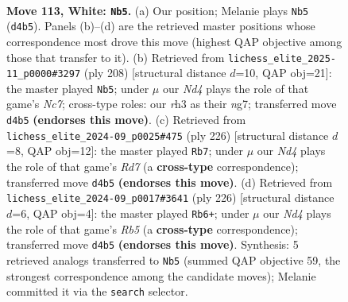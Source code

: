 \documentclass[11pt]{article}
\begin{document}
\clearpage

\begin{figure}[p]\centering
\begin{subfigure}{0.46\textwidth}\centering
\resizebox{\linewidth}{!}{%
\newchessgame
\chessboard[
  setfen={8/5R2/8/3k2K1/3N2P1/7r/8/8 w - - 9 113},
  showmover=false,
  pgfstyle=straightmove, color=movearrow, markmove={d4-b5}
]}
\caption{}
\end{subfigure}\hfill
\begin{subfigure}{0.46\textwidth}\centering
\resizebox{\linewidth}{!}{%
\newchessgame
\chessboard[
  setfen={8/2Nk2n1/6P1/6K1/8/8/8/8 w - - 75 105},
  showmover=false,
  pgfstyle=straightmove, color=movearrow, markmove={c7-b5}
]}
\caption{}
\end{subfigure}
\\[4pt]
\begin{subfigure}{0.46\textwidth}\centering
\resizebox{\linewidth}{!}{%
\newchessgame
\chessboard[
  setfen={4k3/3R4/2r5/5PK1/8/8/8/8 w - - 15 114},
  showmover=false,
  pgfstyle=straightmove, color=movearrow, markmove={d7-b7}
]}
\caption{}
\end{subfigure}\hfill
\begin{subfigure}{0.46\textwidth}\centering
\resizebox{\linewidth}{!}{%
\newchessgame
\chessboard[
  setfen={8/7K/4k2P/1R6/8/8/8/6r1 w - - 35 114},
  showmover=false,
  pgfstyle=straightmove, color=movearrow, markmove={b5-b6}
]}
\caption{}
\end{subfigure}
\caption{\textbf{Move 113, White: \texttt{Nb5}.} (a) Our position; Melanie plays \texttt{Nb5} (\texttt{d4b5}). Panels (b)--(d) are the retrieved master positions whose correspondence most drove this move (highest QAP objective among those that transfer to it). (b) Retrieved from \texttt{lichess\_elite\_2025-11\_p0000\#3297} (ply 208) [structural distance $d$=10, QAP obj=21]: the master played \texttt{Nb5}; under $\mu$ our \emph{Nd4} plays the role of that game's \emph{Nc7}; cross-type roles: our \emph{r}h3 as their \emph{n}g7; transferred move \texttt{d4b5} \textbf{(endorses this move)}. (c) Retrieved from \texttt{lichess\_elite\_2024-09\_p0025\#475} (ply 226) [structural distance $d$=8, QAP obj=12]: the master played \texttt{Rb7}; under $\mu$ our \emph{Nd4} plays the role of that game's \emph{Rd7} (a \textbf{cross-type} correspondence); transferred move \texttt{d4b5} \textbf{(endorses this move)}. (d) Retrieved from \texttt{lichess\_elite\_2024-09\_p0017\#3641} (ply 226) [structural distance $d$=6, QAP obj=4]: the master played \texttt{Rb6+}; under $\mu$ our \emph{Nd4} plays the role of that game's \emph{Rb5} (a \textbf{cross-type} correspondence); transferred move \texttt{d4b5} \textbf{(endorses this move)}. Synthesis: 5 retrieved analogs transferred to \texttt{Nb5} (summed QAP objective 59, the strongest correspondence among the candidate moves); Melanie committed it via the \texttt{search} selector.}
\label{fig:thought-m224}
\end{figure}
\end{document}

